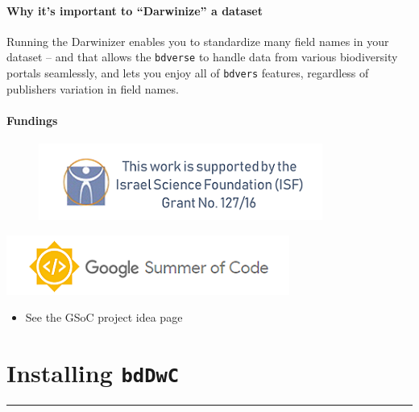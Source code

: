 \documentclass[]{book}
\providecommand{\tightlist}{%
  \setlength{\itemsep}{0pt}\setlength{\parskip}{0pt}}
\theoremstyle{definition}
\theoremstyle{definition}
\theoremstyle{definition}
\theoremstyle{remark}
\begin{document}
\subsubsection*{\texorpdfstring{Why it's important to ``Darwinize'' a
dataset}{Why it's important to Darwinize a dataset}}\label{why-its-important-to-darwinize-a-dataset}

Running the Darwinizer enables you to standardize many field names in
your dataset -- and that allows the \texttt{bdverse} to handle data from
various biodiversity portals seamlessly, and lets you enjoy all of
\texttt{bdvers} features, regardless of publishers variation in field
names.

\subsubsection*{Fundings}\label{fundings}

\begin{figure}
\centering
\includegraphics{img/ISF.png}
\caption{}
\end{figure}

\href{https://summerofcode.withgoogle.com/\%20target=\%22_blank\%22}{\includegraphics{img/GSoC.png}}

\begin{itemize}
\tightlist
\item
  See the GSoC project idea page
\end{itemize}

\chapter{\texorpdfstring{Installing
\texttt{bdDwC}}{Installing bdDwC}}\label{installing-bddwc}

\begin{center}\rule{0.5\linewidth}{\linethickness}\end{center}
\end{document}
